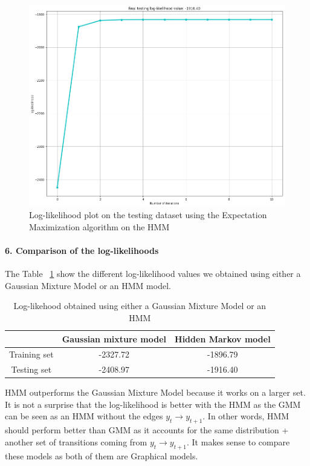 \documentclass[11pt]{article}
\numberwithin{figure}{section} %
\begin{document}
\begin{figure}[H]
\centering
\includegraphics[width=0.75\linewidth]{images/q6_test}
\caption{Log-likelihood plot on the testing dataset using the Expectation Maximization algorithm on the HMM}
\label{fig:log_test}
\end{figure}

\paragraph{6. Comparison of the log-likelihoods}
The Table ~\ref{table:log_comparison} show the different log-likelihood values we obtained using either a Gaussian Mixture Model or an HMM model.

\begin{table}[H]
\centering
\begin{tabular}{|c|c|c|}
\hline
 & \textbf{Gaussian mixture model} & \textbf{Hidden Markov model} \\ \hline
Training set & -2327.72 & -1896.79 \\ \hline
Testing set & -2408.97 & -1916.40 \\ \hline
\end{tabular}
\caption{Log-likehood obtained using either a Gaussian Mixture Model or an HMM}
\label{table:log_comparison}
\end{table}

HMM outperforms the Gaussian Mixture Model because it works on a larger set. It is not a surprise that the log-likelihood is better with the HMM as the GMM can be seen as an HMM without the edges $y_t \rightarrow y_{t+1}$. In other words, HMM should perform better than GMM as it accounts for the same distribution + another set of transitions coming from $y_t \rightarrow y_{t+1}$. It makes sense to compare these models as both of them are Graphical models.
\end{document}

